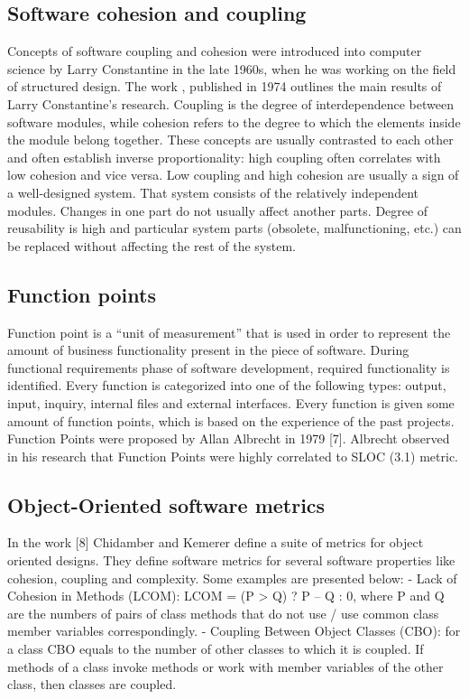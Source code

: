 \subsection{Software cohesion and coupling}
\label{background-cohesion-and-coupling}
\qquad Concepts of software coupling and cohesion were introduced into computer science by Larry Constantine in the late 1960s, when he was working on the field of structured design. The work \cite{cohesion-coupling-paper}, published in 1974 outlines the main results of Larry Constantine's research. Coupling is the degree of interdependence between software modules, while cohesion refers to the degree to which the elements inside the module belong together. These concepts are usually contrasted to each other and often establish inverse proportionality: high coupling often correlates with low cohesion and vice versa. Low coupling and high cohesion are usually a sign of a well-designed system. That system consists of the relatively independent modules. Changes in one part do not usually affect another parts. Degree of reusability is high and particular
system parts (obsolete, malfunctioning, etc.) can be replaced without affecting the rest of the system.

\subsection{Function points}
\qquad Function point is a “unit of measurement” that is used in order to represent the amount of business functionality present in the piece of software. During functional requirements phase of software development, required functionality is identified. Every function is categorized into one of the following types: output, input, inquiry, internal files and external interfaces. Every function is given some amount of function points, which is based on the experience of the past projects. Function Points were proposed by Allan Albrecht in 1979 [7]. Albrecht observed in his research that Function Points were highly correlated to SLOC (3.1) metric.

\subsection{Object-Oriented software metrics}
\qquad In the work [8] Chidamber and Kemerer define a suite of metrics for object oriented designs. They define software metrics for several software properties like cohesion, coupling and complexity. Some examples are presented below:
- Lack of Cohesion in Methods (LCOM): LCOM = (P > Q) ? P – Q : 0, where P
and Q are the numbers of pairs of class methods that do not use / use common class member variables correspondingly.
- Coupling Between Object Classes (CBO): for a class CBO equals to the number
of other classes to which it is coupled. If methods of a class invoke methods or work with member variables of the other class, then classes are coupled.

